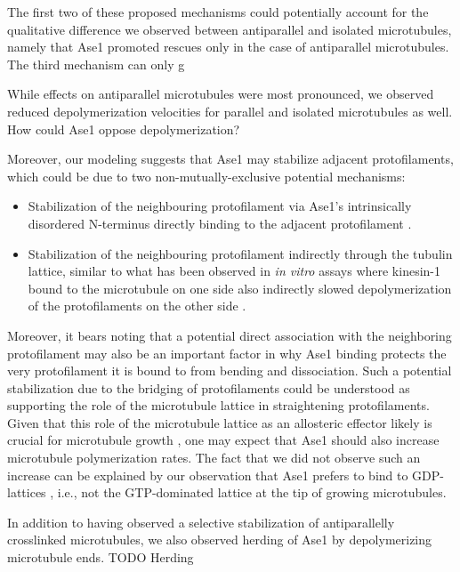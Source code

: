 The first two of these proposed mechanisms could potentially account for the qualitative difference we observed between antiparallel and isolated microtubules, namely that Ase1 promoted rescues only in the case of antiparallel microtubules. The third mechanism can only g \par


While effects on antiparallel microtubules were most pronounced, we observed reduced depolymerization velocities for parallel and isolated microtubules as well. How could Ase1 oppose depolymerization? 

Moreover, our modeling suggests that Ase1 may stabilize adjacent protofilaments, which could be due to two non-mutually-exclusive potential mechanisms:
\begin{itemize}
    \item Stabilization of the neighbouring protofilament via Ase1's intrinsically disordered N-terminus directly binding to the adjacent protofilament \parencite{Subramanian2010}.
    \item Stabilization of the neighbouring protofilament indirectly through the tubulin lattice, similar to what has been observed in \textit{in vitro} assays where kinesin-1 bound to the microtubule on one side also indirectly slowed depolymerization of the protofilaments on the other side \parencite{Peet2018}.
\end{itemize}
Moreover, it bears noting that a potential direct association with the neighboring protofilament may also be an important factor in why Ase1 binding protects the very protofilament it is bound to from bending and dissociation. Such a potential stabilization due to the bridging of protofilaments could be understood as supporting the role of the microtubule lattice in straightening protofilaments. Given that this role of the microtubule lattice as an allosteric effector likely is crucial for microtubule growth , one may expect that Ase1 should also increase microtubule polymerization rates. The fact that we did not observe such an increase can be explained by our observation that Ase1 prefers to bind to GDP-lattices , i.e., not the GTP-dominated lattice at the tip of growing microtubules. \par

In addition to having observed a selective stabilization of antiparallelly crosslinked microtubules, we also observed herding of Ase1 by depolymerizing microtubule ends. TODO Herding 

